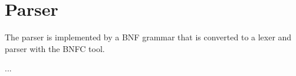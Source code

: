 \section{Parser}
The parser is implemented by a BNF grammar that is converted to a lexer and 
parser with the BNFC tool. 


...

